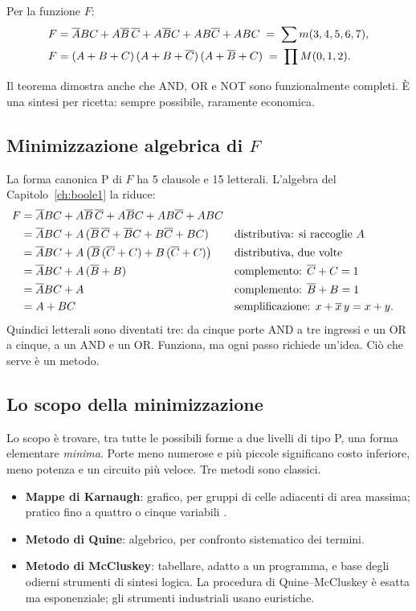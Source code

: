 \smallskip
Per la funzione $F$:
\begin{align*}
F &= \overline{A}BC+A\overline{B}\,\overline{C}+A\overline{B}C+AB\overline{C}+ABC \;=\; \sum m(3,4,5,6,7),\\
F &= (A+B+C)\,(A+B+\overline{C})\,(A+\overline{B}+C) \;=\; \prod M(0,1,2).
\end{align*}

Il teorema dimostra anche che AND, OR e NOT sono funzionalmente completi. È una
sintesi per ricetta: sempre possibile, raramente economica.

\subsection{Minimizzazione algebrica di $F$}

La forma canonica P di $F$ ha 5 clausole e 15 letterali. L'algebra del
Capitolo~\ref{ch:boole1} la riduce:
\begin{align*}
F &= \overline{A}BC+A\overline{B}\,\overline{C}+A\overline{B}C+AB\overline{C}+ABC\\
 &= \overline{A}BC+A\,(\overline{B}\,\overline{C}+\overline{B}C+B\overline{C}+BC) && \text{distributiva: si raccoglie $A$}\\
 &= \overline{A}BC+A\,\bigl(\overline{B}\,(\overline{C}+C)+B\,(\overline{C}+C)\bigr) && \text{distributiva, due volte}\\
 &= \overline{A}BC+A\,(\overline{B}+B) && \text{complemento: $\overline{C}+C=1$}\\
 &= \overline{A}BC+A && \text{complemento: $\overline{B}+B=1$}\\
 &= A+BC && \text{semplificazione: $x+\overline{x}\,y=x+y$.}
\end{align*}
Quindici letterali sono diventati tre: da cinque porte AND a tre ingressi e un
OR a cinque, a un AND e un OR. Funziona, ma ogni passo richiede un'idea. Ciò
che serve è un metodo.

\subsection{Lo scopo della minimizzazione}

Lo scopo è trovare, tra tutte le possibili forme a due livelli di tipo P, una
forma elementare \emph{minima}. Porte meno numerose e più piccole significano
costo inferiore, meno potenza e un circuito più veloce. Tre metodi sono
classici.

\begin{itemize}
\item \textbf{Mappe di Karnaugh}: grafico, per gruppi di celle adiacenti di
  area massima; pratico fino a quattro o cinque variabili
  \citep{karnaugh1953}.
\item \textbf{Metodo di Quine}: algebrico, per confronto sistematico dei termini.
\item \textbf{Metodo di McCluskey}: tabellare, adatto a un programma, e base
  degli odierni strumenti di sintesi logica. La procedura di Quine--McCluskey
  è esatta ma esponenziale; gli strumenti industriali usano euristiche.
\end{itemize}

